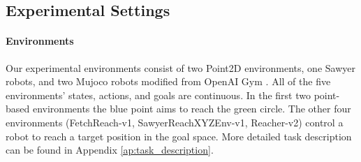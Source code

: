 \documentclass{article}
\begin{document}



\subsection{Experimental Settings}
\label{sec:env_and_setting}

\paragraph{Environments}Our experimental environments consist of two Point2D environments, one Sawyer robots, and two Mujoco robots modified from OpenAI Gym \cite{brockman2016openai}. All of the five environments' states, actions, and goals are continuous. In the first two point-based environments the blue point aims to reach the green circle. The other four environments (FetchReach-v1, SawyerReachXYZEnv-v1, Reacher-v2) control a robot to reach a target position in the goal space. More detailed task description can be found in Appendix \ref{ap:task_description}.
\end{document}
